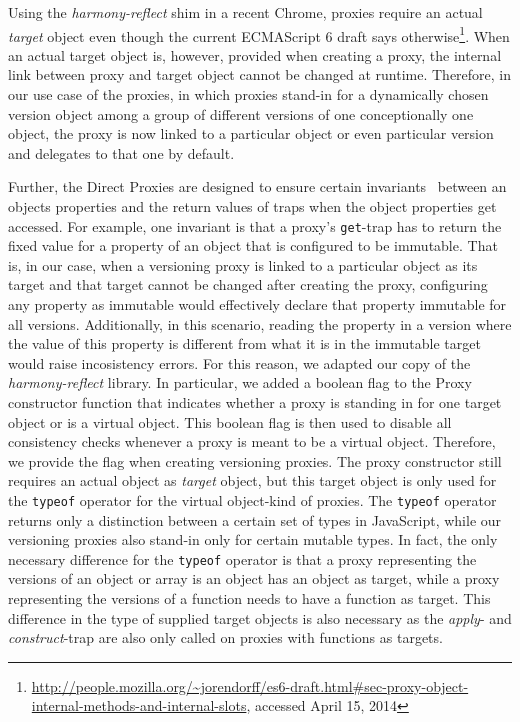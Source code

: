 Using the \emph{harmony-reflect} shim in a recent Chrome, proxies require an actual \emph{target} object even though the current ECMAScript 6 draft says otherwise\footnote{\url{http://people.mozilla.org/~jorendorff/es6-draft.html\#sec-proxy-object-internal-methods-and-internal-slots}, accessed April 15, 2014}.
When an actual target object is, however, provided when creating a proxy, the internal link between proxy and target object cannot be changed at runtime.
Therefore, in our use case of the proxies, in which proxies stand-in for a dynamically chosen version object among a group of different versions of one conceptionally one object, the proxy is now linked to a particular object or even particular version and delegates to that one by default.


Further, the Direct Proxies are designed to ensure certain invariants~\cite{Cutsem2013TRP} between an objects properties and the return values of traps when the object properties get accessed.
For example, one invariant is that a proxy's \lstinline{get}-trap has to return the fixed value for a property of an object that is configured to be immutable.
That is, in our case, when a versioning proxy is linked to a particular object as its target and that target cannot be changed after creating the proxy, configuring any property as immutable would effectively declare that property immutable for all versions.
Additionally, in this scenario, reading the property in a version where the value of this property is different from what it is in the immutable target would raise incosistency errors.
For this reason, we adapted our copy of the \emph{harmony-reflect} library.
In particular, we added a boolean flag to the Proxy constructor function that indicates whether a proxy is standing in for one target object or is a virtual object.
This boolean flag is then used to disable all consistency checks whenever a proxy is meant to be a virtual object.
Therefore, we provide the flag when creating versioning proxies.
The proxy constructor still requires an actual object as \emph{target} object, but this target object is only used for the \lstinline{typeof} operator for the virtual object-kind of proxies.
The \lstinline{typeof} operator returns only a distinction between a certain set of types in JavaScript, while our versioning proxies also stand-in only for certain mutable types.
In fact, the only necessary difference for the \lstinline{typeof} operator is that a proxy representing the versions of an object or array is an object has an object as target, while a proxy representing the versions of a function needs to have a function as target.
This difference in the type of supplied target objects is also necessary as the \emph{apply}- and \emph{construct}-trap are also only called on proxies with functions as targets.


